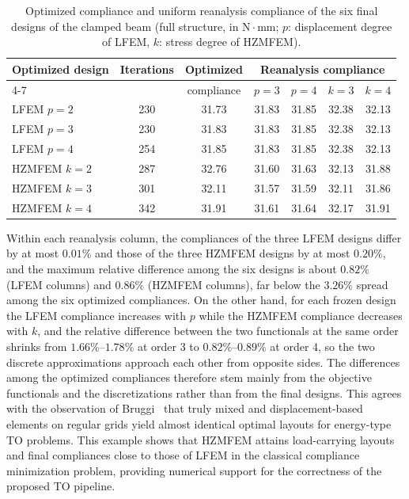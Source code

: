 \begin{table}[htbp]
\centering
\caption{Optimized compliance and uniform reanalysis compliance of the six final designs of the clamped beam (full structure, in $\mathrm{N\cdot mm}$; $p$: displacement degree of LFEM, $k$: stress degree of HZMFEM).}
\label{tab:clamped_beam_reanalysis}
\small
\begin{tabular}{lcccccc}
\toprule
\multirow{2}{*}{Optimized design} & \multirow{2}{*}{Iterations} & Optimized & \multicolumn{4}{c}{Reanalysis compliance} \\
\cmidrule(lr){4-7}
 & & compliance & $p=3$ & $p=4$ & $k=3$ & $k=4$ \\
\midrule
LFEM $p=2$   & 230 & 31.73 & 31.83 & 31.85 & 32.38 & 32.13 \\
LFEM $p=3$   & 230 & 31.83 & 31.83 & 31.85 & 32.38 & 32.13 \\
LFEM $p=4$   & 254 & 31.85 & 31.83 & 31.85 & 32.38 & 32.13 \\
HZMFEM $k=2$ & 287 & 32.76 & 31.60 & 31.63 & 32.13 & 31.88 \\
HZMFEM $k=3$ & 301 & 32.11 & 31.57 & 31.59 & 32.11 & 31.86 \\
HZMFEM $k=4$ & 342 & 31.91 & 31.61 & 31.64 & 32.17 & 31.91 \\
\bottomrule
\end{tabular}
\end{table}

Within each reanalysis column, the compliances of the three LFEM designs differ by at most $0.01\%$ and those of the three HZMFEM designs by at most $0.20\%$, and the maximum relative difference among the six designs is about $0.82\%$ (LFEM columns) and $0.86\%$ (HZMFEM columns), far below the $3.26\%$ spread among the six optimized compliances. On the other hand, for each frozen design the LFEM compliance increases with $p$ while the HZMFEM compliance decreases with $k$, and the relative difference between the two functionals at the same order shrinks from $1.66\%$--$1.78\%$ at order 3 to $0.82\%$--$0.89\%$ at order 4, so the two discrete approximations approach each other from opposite sides. The differences among the optimized compliances therefore stem mainly from the objective functionals and the discretizations rather than from the final designs. This agrees with the observation of Bruggi~\cite{Bruggi2016} that truly mixed and displacement-based elements on regular grids yield almost identical optimal layouts for energy-type TO problems. This example shows that HZMFEM attains load-carrying layouts and final compliances close to those of LFEM in the classical compliance minimization problem, providing numerical support for the correctness of the proposed TO pipeline.

